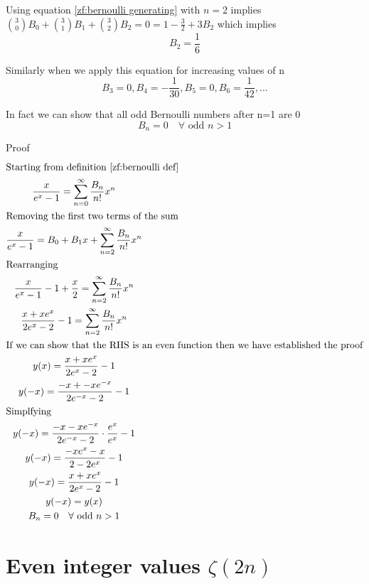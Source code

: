 \documentclass[a4paper]{article}
\begin{document}
Using equation \ref{zf:bernoulli generating} with $n=2$ implies $ \binom{3}{0} B_0 + \binom{3}{1} B_1 + \binom{3}{2} B_2 = 0 = 1 - \frac{3}{2} + 3 B_2 $ which implies 
\begin{equation}
B_2 = \frac{1}{6}
\end{equation}

Similarly when we apply this equation for increasing values of n
\begin{equation}
B_3 = 0, B_4 = -\frac{1}{30}, B_5 = 0, B_6 = \frac{1}{42}, \dots
\end{equation}


\begin{theorem}
In fact we can show that all odd Bernoulli numbers after n=1 are 0
\begin{equation} \label{zf:odd bernoulli} B_n = 0  \quad \forall \text{ odd }n > 1
\end{equation}

Proof
\begin{gather*}
\intertext{Starting from definition \ref{zf:bernoulli def}}
\frac{x}{e^x -1} = \sum_{n=0}^{\infty} \frac{B_n}{n!} x^n
\\
\intertext{Removing the first two terms of the sum}
\frac{x}{e^x -1} = B_0 + B_1 x + \sum_{n=2}^{\infty} \frac{B_n}{n!} x^n\\
\intertext{Rearranging}
\frac{x}{e^x -1}  - 1 + \frac{x}{2}= \sum_{n=2}^{\infty} \frac{B_n}{n!} x^n
\\
\frac{x + xe^x}{2e^x -2}  - 1 = \sum_{n=2}^{\infty} \frac{B_n}{n!} x^n
\\
\intertext{If we can show that the RHS is an even function then we have established the proof}
y(x) = \frac{x + xe^x}{2e^x -2}  - 1
\\
y(-x) = \frac{-x + -xe^{-x}}{2e^{-x} -2}  - 1
\\
\intertext{Simplfying}
y(-x) = \frac{-x -xe^{-x}}{2e^{-x} -2} \cdot \frac{e^x}{e^x}  - 1
\\
y(-x) = \frac{-xe^x -x}{2 -2e^x}  - 1
\\
y(-x) = \frac{x+xe^x}{2e^x - 2}  - 1
\\
y(-x) = y(x)
\\
B_n = 0  \quad \forall \text{ odd }n > 1
\end{gather*}
\end{theorem}

\pagebreak

\section{Even integer values $\zeta(2n)$}
\end{document}
